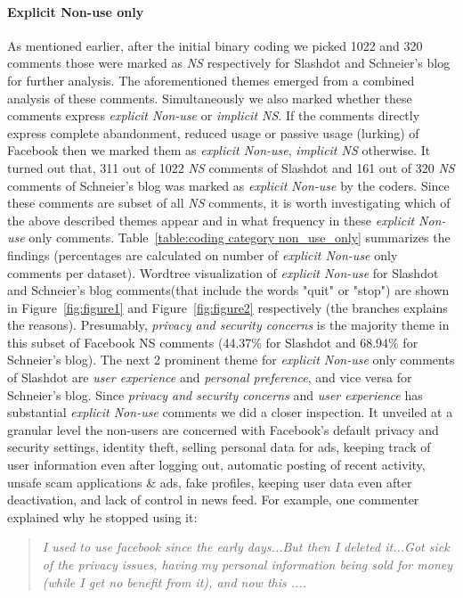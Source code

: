 \paragraph{Explicit Non-use only}
As mentioned earlier, after the initial binary coding we picked 1022 and 320 comments those were marked as \emph{NS} respectively for Slashdot and Schneier's blog for further analysis. The aforementioned themes emerged from a combined analysis of these comments. Simultaneously we also marked whether these comments express \emph{explicit Non-use} or \emph{implicit NS}. If the comments directly express complete abandonment, reduced usage or passive usage (lurking) of Facebook then we marked them as \emph{explicit Non-use}, \emph{implicit NS} otherwise. It turned out that, 311 out of 1022 \emph{NS} comments of Slashdot and 161 out of 320 \emph{NS} comments of Schneier's blog was marked as \emph{explicit Non-use} by the coders. Since these comments are subset of all \emph{NS} comments, it is worth investigating which of the above described themes appear and in what frequency in these \emph{explicit Non-use} only comments. Table~\ref{table:coding category non_use_only} summarizes the findings (percentages are calculated on number of \emph{explicit Non-use} only comments per dataset). Wordtree visualization \cite{schoenebeck2014giving} of \emph{explicit Non-use} for Slashdot  and Schneier's blog comments(that include the words "quit" or "stop") are shown in Figure~\ref{fig:figure1} and Figure~\ref{fig:figure2} respectively (the branches explains the reasons). Presumably, \textit{privacy and security concerns} is the majority theme in this subset of Facebook {NS} comments (44.37\% for Slashdot and 68.94\% for Schneier's blog). The next 2 prominent theme for \emph{explicit Non-use} only comments of Slashdot are \textit{user experience} and \textit{personal preference}, and vice versa for Schneier's blog. Since \textit{privacy and security concerns} and \textit{user experience} has substantial \emph{explicit Non-use} comments we did a closer inspection. It unveiled at a granular level the non-users are concerned with Facebook's default privacy and security settings, identity theft, selling personal data for ads, keeping track of user information even after logging out, automatic posting of recent activity, unsafe scam applications \& ads, fake profiles, keeping user data even after deactivation, and lack of control in news feed. For example, one commenter explained why he stopped using it: 

\begin{quote}
         \textit{I used to use facebook since the early days...But then I deleted it...Got sick of the privacy issues, having my personal information being sold for money (while I get no benefit from it), and now this ....}

\end{quote}

